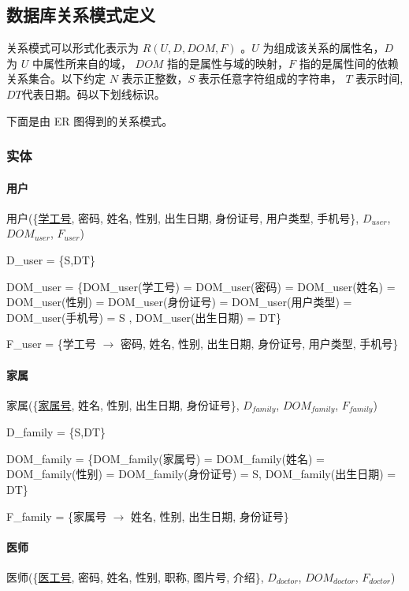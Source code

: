 \documentclass{article}
\begin{document}
\subsection{数据库关系模式定义}
关系模式可以形式化表⽰为 $R(U, D, DOM, F)$ 。$U$ 为组成该关系的属性名，$D$ 为 $U$ 中属性所来⾃的域，
$DOM$ 指的是属性与域的映射，$F$ 指的是属性间的依赖关系集合。以下约定 $N$ 表示正整数，$S$ 表示任意字符组成的字符串， $T$ 表示时间, $DT$代表日期。码以下划线标识。

下面是由 ER 图得到的关系模式。

\subsubsection{实体}

\paragraph{用户}

用户(\{\underline{学工号}, 密码, 姓名, 性别, 出生日期, 身份证号, 用户类型, 手机号\}, $D_{user}$, $DOM_{user}$, $F_{user}$)

D\_user = \{S,DT\}

DOM\_user = \{DOM\_user(学工号) = DOM\_user(密码) = DOM\_user(姓名) = DOM\_user(性别) = DOM\_user(身份证号) = DOM\_user(用户类型) = DOM\_user(手机号) = S , DOM\_user(出生日期) = DT\}

F\_user = \{学工号 $\rightarrow$ 密码, 姓名, 性别, 出生日期, 身份证号, 用户类型, 手机号\}

\paragraph{家属}

家属(\{\underline{家属号}, 姓名, 性别, 出生日期, 身份证号\}, $D_{family}$, $DOM_{family}$, $F_{family}$)

D\_family = \{S,DT\}

DOM\_family = \{DOM\_family(家属号) = DOM\_family(姓名) = DOM\_family(性别) = DOM\_family(身份证号) = S, DOM\_family(出生日期) = DT\}

F\_family = \{家属号 $\rightarrow$ 姓名, 性别, 出生日期, 身份证号\}

\paragraph{医师}

医师(\{\underline{医工号}, 密码, 姓名, 性别, 职称, 图片号, 介绍\}, $D_{doctor}$, $DOM_{doctor}$, $F_{doctor}$)
\end{document}
